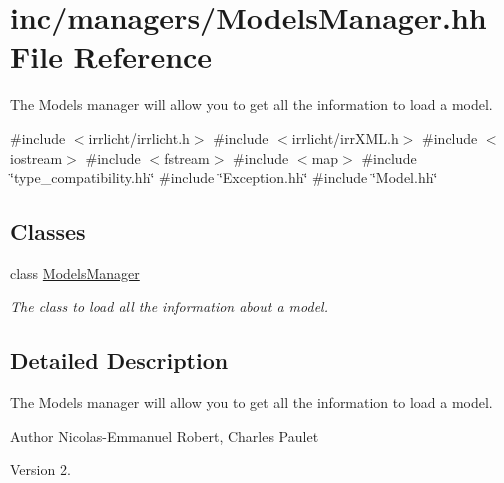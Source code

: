 \hypertarget{ModelsManager_8hh}{}\section{inc/managers/\+Models\+Manager.hh File Reference}
\label{ModelsManager_8hh}


The Models manager will allow you to get all the information to load a model.  


{\ttfamily \#include $<$irrlicht/irrlicht.\+h$>$}\newline
{\ttfamily \#include $<$irrlicht/irr\+X\+M\+L.\+h$>$}\newline
{\ttfamily \#include $<$iostream$>$}\newline
{\ttfamily \#include $<$fstream$>$}\newline
{\ttfamily \#include $<$map$>$}\newline
{\ttfamily \#include \char`\"{}type\+\_\+compatibility.\+hh\char`\"{}}\newline
{\ttfamily \#include \char`\"{}Exception.\+hh\char`\"{}}\newline
{\ttfamily \#include \char`\"{}Model.\+hh\char`\"{}}\newline
\subsection*{Classes}
\begin{DoxyCompactItemize}
\item 
class \hyperlink{classModelsManager}{Models\+Manager}
\begin{DoxyCompactList}\small\item\em The class to load all the information about a model. \end{DoxyCompactList}\end{DoxyCompactItemize}


\subsection{Detailed Description}
The Models manager will allow you to get all the information to load a model. 

\begin{DoxyAuthor}{Author}
Nicolas-\/\+Emmanuel Robert, Charles Paulet 
\end{DoxyAuthor}
\begin{DoxyVersion}{Version}
2. 
\end{DoxyVersion}
